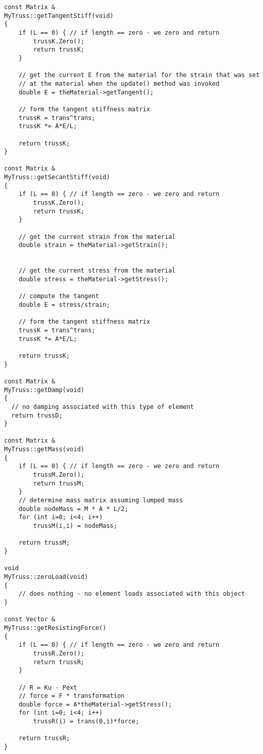 \documentclass[12pt]{article}
\begin{document}
{\sf\small
\begin{verbatim}
const Matrix &
MyTruss::getTangentStiff(void)
{
    if (L == 0) { // if length == zero - we zero and return
        trussK.Zero();
        return trussK;
    }

    // get the current E from the material for the strain that was set
    // at the material when the update() method was invoked
    double E = theMaterial->getTangent();

    // form the tangent stiffness matrix
    trussK = trans^trans;
    trussK *= A*E/L;  

    return trussK;
}

const Matrix &
MyTruss::getSecantStiff(void)
{
    if (L == 0) { // if length == zero - we zero and return
        trussK.Zero();
        return trussK;
    }

    // get the current strain from the material
    double strain = theMaterial->getStrain();


    // get the current stress from the material 
    double stress = theMaterial->getStress();   

    // compute the tangent  
    double E = stress/strain;

    // form the tangent stiffness matrix
    trussK = trans^trans;
    trussK *= A*E/L;  

    return trussK;
}
    
const Matrix &
MyTruss::getDamp(void)
{
  // no damping associated with this type of element
  return trussD;
}

const Matrix &
MyTruss::getMass(void)
{ 
    if (L == 0) { // if length == zero - we zero and return
        trussM.Zero();
        return trussM;
    }
    // determine mass matrix assuming lumped mass
    double nodeMass = M * A * L/2;
    for (int i=0; i<4; i++) 
        trussM(i,i) = nodeMass;

    return trussM;
}

void 
MyTruss::zeroLoad(void)
{
    // does nothing - no element loads associated with this object
}

const Vector &
MyTruss::getResistingForce()
{	
    if (L == 0) { // if length == zero - we zero and return
        trussR.Zero();
        return trussR;
    }

    // R = Ku - Pext
    // force = F * transformation 
    double force = A*theMaterial->getStress();
    for (int i=0; i<4; i++)
        trussR(i) = trans(0,i)*force;

    return trussR;
}


\end{verbatim}}
\end{document}
